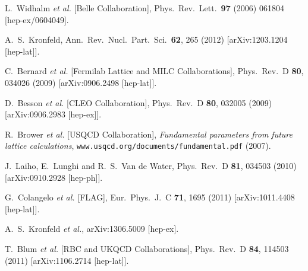 \begin{thebibliography}{99}
  L.~Widhalm {\it et al.}  [Belle Collaboration],
  Phys.\ Rev.\ Lett.\  {\bf 97} (2006) 061804
  [hep-ex/0604049].
  
  A.~S.~Kronfeld,
  Ann.\ Rev.\ Nucl.\ Part.\ Sci.\  {\bf 62}, 265 (2012)
  [arXiv:1203.1204 [hep-lat]].
  
  C.~Bernard {\it et al.} [Fermilab Lattice and MILC Collaborations],
  Phys.\ Rev.\ D {\bf 80}, 034026 (2009)
  [arXiv:0906.2498 [hep-lat]].
  
  D.~Besson {\it et al.}  [CLEO Collaboration],
  Phys.\ Rev.\ D {\bf 80}, 032005 (2009)
  [arXiv:0906.2983 [hep-ex]].
  
R.~Brower {\em et al.} [USQCD Collaboration],
{\em Fundamental parameters from future lattice  calculations},
{\tt www.usqcd.org/documents/fundamental.pdf} (2007).

  J.~Laiho, E.~Lunghi and R.~S.~Van de Water,
  Phys.\ Rev.\ D {\bf 81}, 034503 (2010)
  [arXiv:0910.2928 [hep-ph]].

  G.~Colangelo {\it et al.} [FLAG],
  Eur.\ Phys.\ J.\ C {\bf 71}, 1695 (2011)
  [arXiv:1011.4408 [hep-lat]].
  
  
  A.~S.~Kronfeld {\it et al.},
  arXiv:1306.5009 [hep-ex].
 
  T.~Blum {\it et al.} [RBC and UKQCD Collaborations],
  Phys.\ Rev.\ D {\bf 84}, 114503 (2011)
  [arXiv:1106.2714 [hep-lat]]. 
  

\end{thebibliography}
